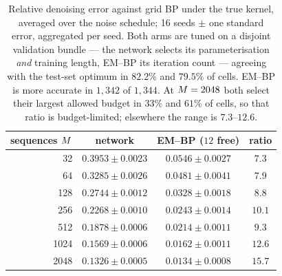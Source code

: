 
\begin{table}[!htbp]
\caption{Relative denoising error against grid BP under the true kernel, averaged over the noise
schedule; 16 seeds $\pm$ one standard error, aggregated per seed. Both arms are tuned on a
disjoint validation bundle --- the network selects its parameterisation \emph{and} training
length, EM--BP its iteration count --- agreeing with the test-set optimum in $82.2\%$ and
$79.5\%$ of cells. EM--BP is more accurate in $1{,}342$ of $1{,}344$.
At $M = 2048$ both select their largest allowed budget in $33\%$ and
$61\%$ of cells, so that ratio is budget-limited; elsewhere the range is
$7.3$--$12.6$.}
\label{tab:pointwise}
\centering
\begin{tabular}{rccc}
\toprule
sequences $M$ & network & EM--BP ($12$ free) & ratio \\
\midrule
32   & $0.3953 \pm 0.0023$ & $\mathbf{0.0546 \pm 0.0027}$ & $7.3$ \\
64   & $0.3285 \pm 0.0026$ & $\mathbf{0.0481 \pm 0.0041}$ & $7.9$ \\
128  & $0.2744 \pm 0.0012$ & $\mathbf{0.0328 \pm 0.0018}$ & $8.8$ \\
256  & $0.2268 \pm 0.0010$ & $\mathbf{0.0243 \pm 0.0014}$ & $10.1$ \\
512  & $0.1878 \pm 0.0006$ & $\mathbf{0.0214 \pm 0.0011}$ & $9.3$ \\
1024 & $0.1569 \pm 0.0006$ & $\mathbf{0.0162 \pm 0.0011}$ & $12.6$ \\
2048 & $0.1326 \pm 0.0005$ & $\mathbf{0.0134 \pm 0.0008}$ & $15.7$ \\
\bottomrule
\end{tabular}
\end{table}
